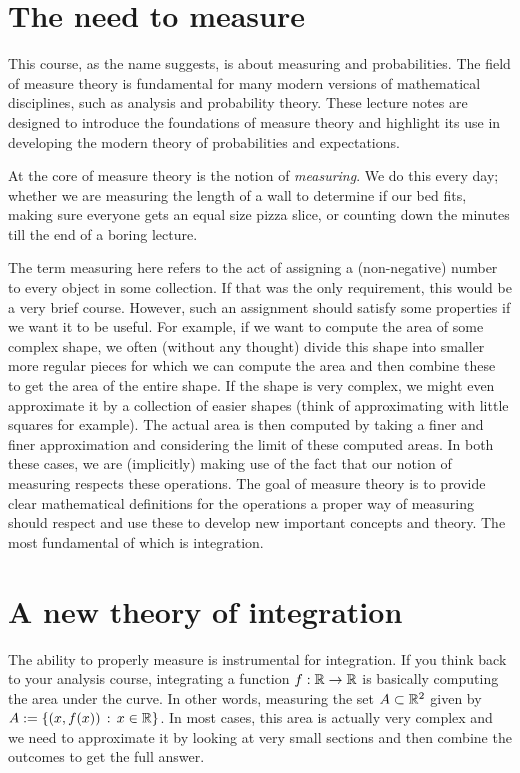 


\section{The need to measure}
This course, as the name suggests, is about measuring and probabilities. The field of measure theory is fundamental for many modern versions of mathematical disciplines, such as analysis and probability theory. These lecture notes are designed to introduce the foundations of measure theory and highlight its use in developing the modern theory of probabilities and expectations.  

At the core of measure theory is the notion of \emph{measuring}. We do this every day; whether we are measuring the length of a wall to determine if our bed fits, making sure everyone gets an equal size pizza slice, or counting down the minutes till the end of a boring lecture. 

The term measuring here refers to the act of assigning a (non-negative) number to every object in some collection. If that was the only requirement, this would be a very brief course. However, such an assignment should satisfy some properties if we want it to be useful. For example, if we want to compute the area of some complex shape, we often (without any thought) divide this shape into smaller more regular pieces for which we can compute the area and then combine these to get the area of the entire shape. If the shape is very complex, we might even approximate it by a collection of easier shapes (think of approximating with little squares for example). The actual area is then computed by taking a finer and finer approximation and considering the limit of these computed areas. In both these cases, we are (implicitly) making use of the fact that our notion of measuring respects these operations. The goal of measure theory is to provide clear mathematical definitions for the operations a proper way of measuring should respect and use these to develop new important concepts and theory. The most fundamental of which is integration. 

\section{A new theory of integration}

The ability to properly measure is instrumental for integration. If you think back to your analysis course, integrating a function $f : \mathbb R \to \mathbb R$ is basically computing the area under the curve. In other words, measuring the set $A \subset \mathbb R^2$ given by $A := \{(x,f(x)) \, :\, x \in \mathbb R\}$. In most cases, this area is actually very complex and we need to approximate it by looking at very small sections and then combine the outcomes to get the full answer.

